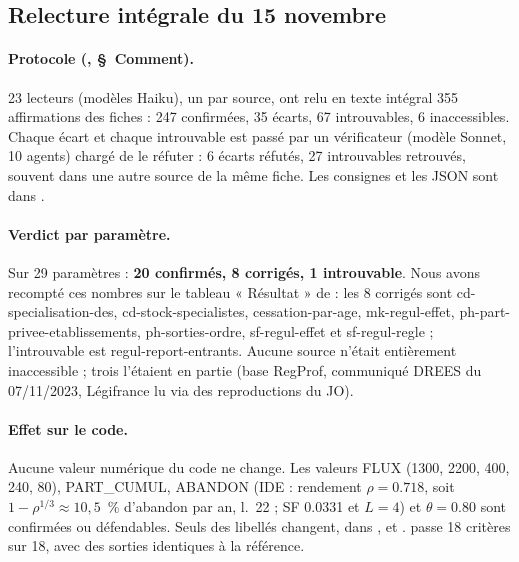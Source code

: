 \subsection{Relecture intégrale du 15 novembre}\label{par:relecture}

\paragraph{Protocole (, \S~Comment).} 23\mesure{} lecteurs (modèles Haiku), un par source,
ont relu en texte intégral 355\mesure{} affirmations des fiches : 247\mesure{} confirmées, 35\mesure{} écarts,
67\mesure{} introuvables, 6\mesure{} inaccessibles. Chaque écart et chaque introuvable est passé par un
vérificateur (modèle Sonnet, 10\mesure{} agents) chargé de le réfuter : 6\mesure{} écarts réfutés,
27\mesure{} introuvables retrouvés, souvent dans une autre source de la même fiche. Les consignes et les JSON
sont dans .

\paragraph{Verdict par paramètre.} Sur 29\mesure{} paramètres : \textbf{20\mesure{} confirmés, 8\mesure{}
corrigés, 1\mesure{} introuvable}. Nous avons recompté ces nombres sur le tableau « Résultat » de
 : les 8 corrigés sont cd-specialisation-des, cd-stock-specialistes, cessation-par-age,
mk-regul-effet, ph-part-privee-etablissements, ph-sorties-ordre, sf-regul-effet et sf-regul-regle ;
l'introuvable est regul-report-entrants. Aucune source n'était entièrement inaccessible ; trois l'étaient en
partie (base RegProf, communiqué DREES du 07/11/2023, Légifrance lu via des reproductions du JO).

\paragraph{Effet sur le code.} Aucune valeur numérique du code ne change. Les valeurs FLUX (\num{1300},
\num{2200}, 400, 240, 80), PART\_CUMUL, ABANDON (IDE : rendement $\rho = \num{0.718}$\mesure{}, soit $1-\rho^{1/3} \approx 10{,}5$~\%\derive{} d'abandon par an,  l.~22 ; SF \num{0.0331} et $L = 4$) et
$\theta = \num{0.80}$\suppose{} sont confirmées ou défendables. Seuls des libellés changent, dans
,  et .  passe
18\mesure{} critères sur 18, avec des sorties identiques à la référence.

